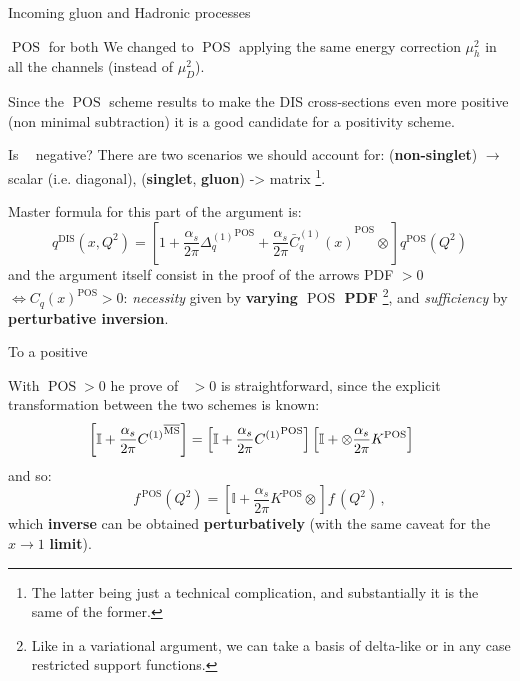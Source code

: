 \documentclass[8pt]{beamer}
\DeclareMathOperator{\msbar}{\overline{MS}}
\DeclareMathOperator{\pos}{POS}
\begin{document}
\begin{frame}{Incoming gluon and Hadronic processes}
    \vspace*{15pt}
    \begin{block}{$\pos$ for both}
    \vspace*{1pt}
        We changed to $\pos$ applying the same energy correction $\mu_h^2$ in all
        the channels (instead of $\mu_D^2$).

        Since the $\pos$ scheme results to make the DIS cross-sections even more
        positive (non minimal subtraction) it is a good candidate for a positivity
        scheme.
    \end{block}
\end{frame}


\begin{frame}{Is $\msbar$ negative?}
    There are two scenarios we should account for: (\textbf{non-singlet}) $\to$
    scalar (i.e. diagonal), (\textbf{singlet}, \textbf{gluon}) -> matrix
    \footnote{The latter being just a technical complication, and substantially
    it is the same of the former.}.

    \vspace*{10pt}
    Master formula for this part of the argument is:
    \begin{equation*}
        q^{\text{DIS}}(x,Q^2)=
        \left[1+\frac{\alpha_s}{2\pi} {\Delta^{(1)}_q}^{\pos}
        +\frac{\alpha_s}{2\pi}  {\bar
        C^{(1)}_q(x)}^{\pos}\otimes\right]q^{\pos}(Q^2)
    \end{equation*}
    and the argument itself consist in the proof of the arrows PDF $> 0$ $\iff
    C_q(x)^{\pos} > 0$: \textit{necessity} given by \textbf{varying $\pos$
    PDF} \footnote{Like in a variational argument, we can take a basis of
    delta-like or in any case restricted support functions.}, and
    \textit{sufficiency} by \textbf{perturbative inversion}.

    \vspace*{15pt}
    \begin{block}{To a positive $\msbar$}
    \vspace*{1pt}

    With $\pos > 0$ he prove of $\msbar > 0$ is straightforward, since the
    explicit transformation between the two schemes is known:
    \begin{equation*}
        \hspace*{-12pt}\left[\mathbb{I}
        +\frac{\alpha_s}{2\pi} {C^{(1)}}^{\msbar}\right]=\left[\mathbb{I}
          +\frac{\alpha_s}{2\pi} {C^{(1)}}^{\pos}
          \right]\left[\mathbb{I}
          + \otimes \frac{\alpha_s}{2\pi}  K^{\pos}\right]
    \end{equation*}
    and so:
    \begin{equation*}
     f^{\,\pos}(Q^2)=\left[\mathbb{I}
      +\frac{\alpha_s}{2\pi}  K^{\pos}\otimes\right] f^{\,\msbar}(Q^2)\,,
    \end{equation*}
    which \textbf{inverse} can be obtained \textbf{perturbatively} (with the
    same caveat for the $x \to 1$ \textbf{limit}).
    \end{block}
\end{frame}
\end{document}
